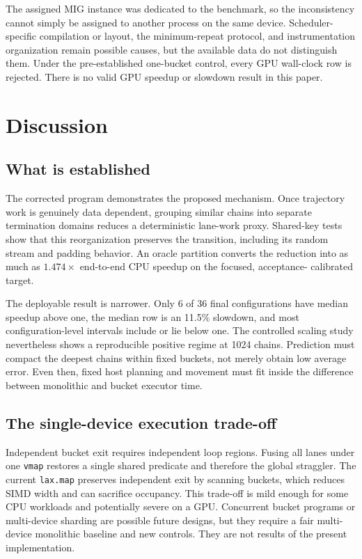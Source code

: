 \documentclass[conference]{IEEEtran}
\begin{document}
The assigned MIG instance was dedicated to the benchmark, so the inconsistency
cannot simply be assigned to another process on the same device.  Scheduler-
specific compilation or layout, the minimum-repeat protocol, and instrumentation
organization remain possible causes, but the available data do not distinguish
them.  Under the pre-established one-bucket control, every GPU wall-clock row is
rejected.  There is no valid GPU speedup or slowdown result in this paper.

\section{Discussion}

\subsection{What is established}

The corrected program demonstrates the proposed mechanism.  Once trajectory
work is genuinely data dependent, grouping similar chains into separate
termination domains reduces a deterministic lane-work proxy.  Shared-key tests
show that this reorganization preserves the transition, including its random
stream and padding behavior.  An oracle partition converts the reduction into
as much as $1.474\times$ end-to-end CPU speedup on the focused, acceptance-
calibrated target.

The deployable result is narrower.  Only 6 of 36 final configurations have
median speedup above one, the median row is an 11.5\% slowdown, and most
configuration-level intervals include or lie below one.  The controlled scaling
study nevertheless shows a reproducible positive regime at 1024 chains.
Prediction must compact the deepest chains within fixed buckets, not merely
obtain low average error.  Even then, fixed host planning and movement must fit
inside the difference between monolithic and bucket executor time.

\subsection{The single-device execution trade-off}

Independent bucket exit requires independent loop regions.  Fusing all lanes
under one \texttt{vmap} restores a single shared predicate and therefore the
global straggler.  The current \texttt{lax.map} preserves independent exit by
scanning buckets, which reduces SIMD width and can sacrifice occupancy.  This
trade-off is mild enough for some CPU workloads and potentially severe on a
GPU.  Concurrent bucket programs or multi-device sharding are possible future
designs, but they require a fair multi-device monolithic baseline and new
controls.  They are not results of the present implementation.
\end{document}
